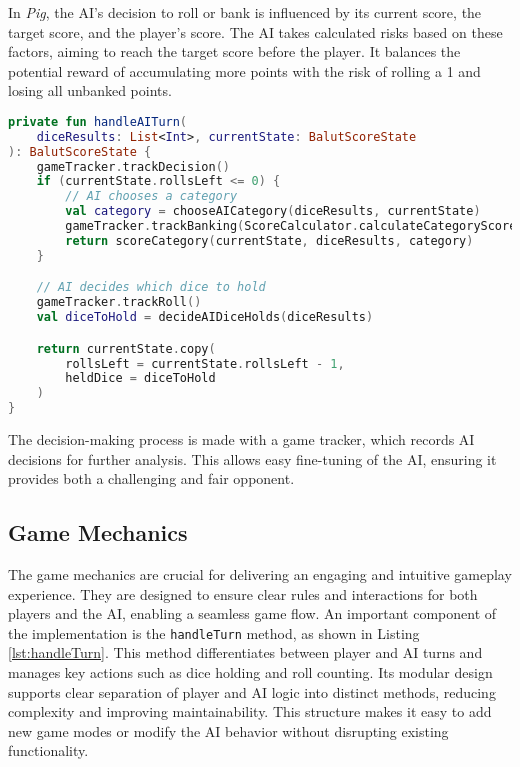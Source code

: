 In \emph{Pig}, the AI's decision to roll or bank is influenced by its current score, the target score, and the player's score.  The AI takes calculated risks based on these factors, aiming to reach the target score before the player. It balances the potential reward of accumulating more points with the risk of rolling a 1 and losing all unbanked points.

\begin{lstlisting}[language=Kotlin, caption={handleAITurn Function}, label=lst:ai_turn_function]
private fun handleAITurn(
    diceResults: List<Int>, currentState: BalutScoreState
): BalutScoreState {
    gameTracker.trackDecision()
    if (currentState.rollsLeft <= 0) {
        // AI chooses a category
        val category = chooseAICategory(diceResults, currentState)
        gameTracker.trackBanking(ScoreCalculator.calculateCategoryScore(diceResults, category))
        return scoreCategory(currentState, diceResults, category)
    }

    // AI decides which dice to hold
    gameTracker.trackRoll()
    val diceToHold = decideAIDiceHolds(diceResults)

    return currentState.copy(
        rollsLeft = currentState.rollsLeft - 1,
        heldDice = diceToHold
    )
}
\end{lstlisting}

The decision-making process is made with a game tracker, which records AI decisions for further analysis. This allows easy fine-tuning of the AI, ensuring it provides both a challenging and fair opponent.

\subsection{Game Mechanics}

The game mechanics are crucial for delivering an engaging and intuitive gameplay experience. They are designed to ensure clear rules and interactions for both players and the AI, enabling a seamless game flow.
An important component of the implementation is the \texttt{handleTurn} method, as shown in Listing \ref{lst:handleTurn}. This method differentiates between player and AI turns and manages key actions such as dice holding and roll counting. Its modular design supports clear separation of player and AI logic into distinct methods, reducing complexity and improving maintainability. This structure makes it easy to add new game modes or modify the AI behavior without disrupting existing functionality.

